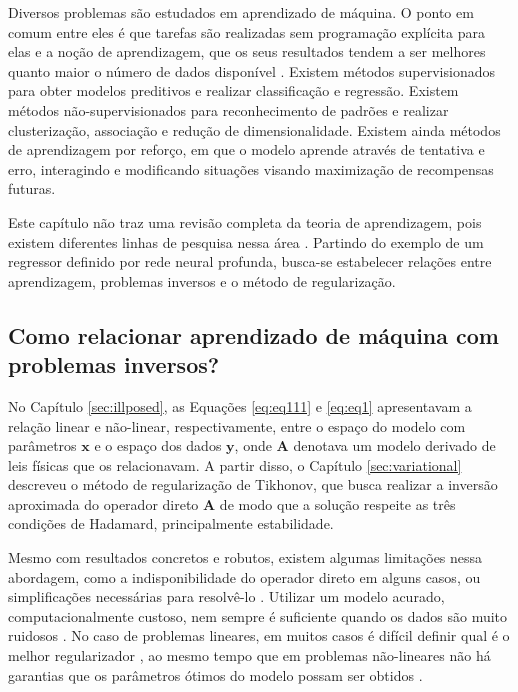 Diversos problemas são estudados em aprendizado de máquina. O ponto em comum entre eles é que tarefas são realizadas sem programação explícita para elas \cite{Bzdok2018} e a noção de aprendizagem, que os seus resultados tendem a ser melhores quanto maior o número de dados disponível \cite[pág. 2]{mitchell1997machine}. Existem métodos supervisionados para obter modelos preditivos e realizar classificação e regressão. Existem métodos não-supervisionados para reconhecimento de padrões e realizar clusterização, associação e redução de dimensionalidade. Existem ainda métodos de aprendizagem por reforço, em que o modelo aprende através de tentativa e erro, interagindo e modificando situações visando maximização de recompensas futuras. 

Este capítulo não traz uma revisão completa da teoria de aprendizagem, pois existem diferentes linhas de pesquisa nessa área \cite{goodfellow2016deep, mitchell1997machine, vapnik1998statistical}. Partindo do exemplo de um regressor definido por rede neural profunda, busca-se estabelecer relações entre aprendizagem, problemas inversos e o método de regularização. 

\subsection{Como relacionar aprendizado de máquina com problemas inversos?}\label{sec:general}

No Capítulo \ref{sec:illposed}, as Equações \eqref{eq:eq111} e \eqref{eq:eq1} apresentavam a relação linear e não-linear, respectivamente, entre o espaço do modelo com parâmetros $\mathbf{x}$ e o espaço dos dados $\mathbf{y}$, onde $\mathbf{A}$ denotava um modelo derivado de leis físicas que os relacionavam. A partir disso, o Capítulo \ref{sec:variational} descreveu o método de regularização de Tikhonov, que busca realizar a inversão aproximada do operador direto $\mathbf{A}$ de modo que a solução respeite as três condições de Hadamard, principalmente estabilidade. 

Mesmo com resultados concretos e robutos, existem algumas limitações nessa abordagem, como a indisponibilidade do operador direto em alguns casos, ou simplificações necessárias para resolvê-lo \cite[pág. 3]{Arridge2019}. Utilizar um modelo acurado, computacionalmente custoso, nem sempre é suficiente quando os dados são muito ruidosos \cite[pág. 105]{Arridge2019}. No caso de problemas lineares, em muitos casos é difícil definir qual é o melhor regularizador \cite{DelosReyes2016}, ao mesmo tempo que em problemas não-lineares não há garantias que os parâmetros ótimos do modelo possam ser obtidos \cite{Adler2021}. 

